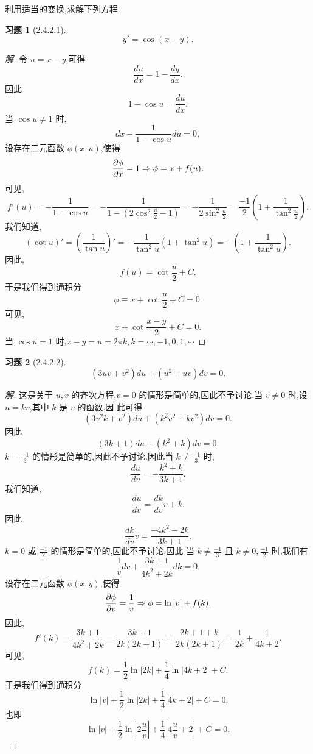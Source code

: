 \documentclass[a4paper, 12pt]{article} %
\newtheorem*{cdtheorem}{习题}
\newenvironment{exercise}
{\bigskip\begin{mdframed}[backgroundcolor=gray!40,rightline=false,leftline=false,topline=false,bottomline=false]\begin{cdtheorem}}
    {\end{cdtheorem}\end{mdframed}\bigskip}
\begin{document}
\begin{CJK}{UTF8}{gkai}
  利用适当的变换,求解下列方程
  \begin{exercise}[2.4.2.1]
$$
y'=\cos (x-y).
$$    
  \end{exercise}
  \begin{proof}[解]
    令 $u=x-y$,可得
$$
\frac{du}{dx}=1-\frac{dy}{dx}.
$$
因此
$$
1-\cos u=\frac{du}{dx}.
$$
当 $\cos u\neq 1$ 时,
$$
dx-\frac{1}{1-\cos u}du=0,
$$
设存在二元函数 $\phi(x,u)$,使得
$$
\frac{\partial\phi}{\partial x}=1\Rightarrow \phi=x+f(u).
$$
可见,
$$
f'(u)=-\frac{1}{1-\cos u}=-\frac{1}{1-(2\cos^2
  \frac{u}{2}-1)}=-\frac{1}{2\sin^2
  \frac{u}{2}}=\frac{-1}{2}(1+\frac{1}{\tan^2 \frac{u}{2}}).
$$
我们知道,
$$
(\cot u)'=(\frac{1}{\tan u})'=-\frac{1}{\tan^2u}(1+\tan^2u)=-(1+\frac{1}{\tan^2u}).
$$
因此,
$$
f(u)=\cot \frac{u}{2}+C.
$$
于是我们得到通积分
$$
\phi\equiv x+\cot \frac{u}{2}+C=0.
$$
可见,
$$
x+\cot \frac{x-y}{2}+C=0.
$$
当 $\cos u=1$ 时,$x-y=u=2\pi k,k=\cdots,-1,0,1,\cdots$
  \end{proof}
  \begin{exercise}[2.4.2.2]
$$
(3uv+v^2)du+(u^2+uv)dv=0.
$$
  \end{exercise}
  \begin{proof}[解]
    这是关于 $u,v$ 的齐次方程,$v=0$ 的情形是简单的,因此不予讨论.当 $v\neq 0$ 时,设 $u=kv$,其中 $k$ 是 $v$ 的函数.因
    此可得
$$
(3v^2k+v^2)du+(k^2v^2+kv^2)dv=0.
$$
因此
$$
(3k+1)du+(k^2+k)dv=0.
$$
$k=\frac{-1}{3}$ 的情形是简单的,因此不予讨论.因此当 $k\neq \frac{-1}{3}$ 时,
$$
\frac{du}{dv}=-\frac{k^2+k}{3k+1}.
$$
我们知道,
$$
\frac{du}{dv}=\frac{dk}{dv}v+k.
$$
因此
$$
\frac{dk}{dv}v=\frac{-4k^2-2k}{3k+1}.
$$
$k=0$ 或 $\frac{-1}{2}$ 的情形是简单的,因此不予讨论.因此 当 $k\neq \frac{-1}{3}$ 且 $k\neq 0,\frac{-1}{2}$ 时,我们有
$$
\frac{1}{v}dv+\frac{3k+1}{4k^2+2k}dk=0.
$$
设存在二元函数 $\phi(x,y)$,使得
$$
\frac{\partial\phi}{\partial v}=\frac{1}{v}\Rightarrow \phi=\ln |v|+f(k).
$$
因此,
$$
f'(k)=\frac{3k+1}{4k^2+2k}=\frac{3k+1}{2k(2k+1)}=\frac{2k+1+k}{2k(2k+1)}=\frac{1}{2k}+\frac{1}{4k+2}.
$$
可见,
$$
f(k)=\frac{1}{2}\ln |2k|+\frac{1}{4}\ln |4k+2|+C.
$$
于是我们得到通积分
$$
\ln |v|+\frac{1}{2}\ln |2k|+\frac{1}{4}|4k+2|+C=0.
$$
也即
$$
\ln |v|+\frac{1}{2}\ln |2 \frac{u}{v}|+\frac{1}{4}|4 \frac{u}{v}+2|+C=0.
$$



  \end{proof}
  
  
\end{CJK}
\end{document}
